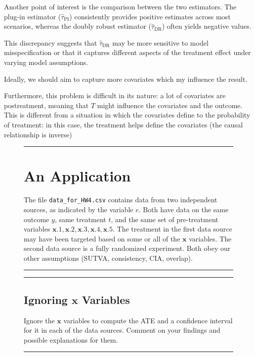 \documentclass{article}
\newenvironment{colorparagraph}[1]{\par\color{#1}}{\par}
\begin{document}
Another point of interest is the comparison between the two estimators. The plug-in estimator ($\hat{\tau}_{\text{PI}}$) consistently provides positive estimates across most scenarios, whereas the doubly robust estimator ($\hat{\tau}_{\text{DR}}$) often yields negative values.

This discrepancy suggests that $\hat{\tau}_{\text{DR}}$ may be more sensitive to model misspecification or that it captures different aspects of the treatment effect under varying model assumptions.

Ideally, we should aim to capture more covariates which my influence the result.

Furthermore, this problem is difficult in its nature: a lot of covariates are postreatment, meaning that $T$ might influence the covariates and the outcome. This is different from a situation in which the covariates define to the probability of treatment: in this case, the treatment helps define the covariates (the causal relationship is inverse)

\begin{figure}[H]
  \begin{colorparagraph}{questioncolor}
  \rule{\textwidth}{0.5pt}
  \label{q3}
  \section{An Application}

  The file \texttt{data\_for\_HW4.csv} contains data from two independent sources, as indicated by the variable \( e \). Both have data on the same outcome \( y \), same treatment \( t \), and the same set of pre-treatment variables \( \mathbf{x}.1, \mathbf{x}.2, \mathbf{x}.3, \mathbf{x}.4, \mathbf{x}.5 \). The treatment in the first data source may have been targeted based on some or all of the \( \mathbf{x} \) variables. The second data source is a fully randomized experiment. Both obey our other assumptions (SUTVA, consistency, CIA, overlap).

  \rule{\textwidth}{0.5pt}
  \end{colorparagraph}
\end{figure}

\begin{figure}[H]
  \begin{colorparagraph}{questioncolor}
  \rule{\textwidth}{0.5pt}
  \label{q3a}
  \subsection{Ignoring \( \mathbf{x} \) Variables}

  Ignore the \( \mathbf{x} \) variables to compute the ATE and a confidence interval for it in each of the data sources. Comment on your findings and possible explanations for them.

  \rule{\textwidth}{0.5pt}
  \end{colorparagraph}
\end{figure}
\end{document}

